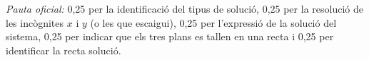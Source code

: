 \begin{apartats}
\begin{solucio}
\textit{Pauta oficial:} 0,25 per la identificació del tipus de solució, 0,25 per la resolució de les incògnites $x$ i
$y$ (o les que escaigui), 0,25 per l'expressió de la solució del sistema, 0,25 per indicar que els tres plans es tallen
en una recta i 0,25 per identificar la recta solució.
\end{solucio}

\end{apartats}
